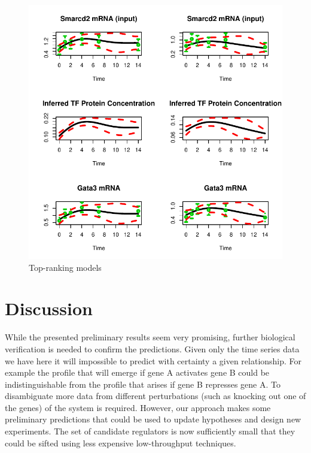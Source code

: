\documentclass{article}
\begin{document}
\begin{figure}[htb]
  \centering
  \includegraphics[width=\columnwidth]{gpdisim_Smarcd2_Gata3}
  \caption{Top-ranking models}
  \label{fig:model5}
\end{figure}

\section{Discussion}

While the  presented preliminary results seem  very promising, further
biological verification  is needed to confirm  the predictions.  Given
only the time  series data we have here it  will impossible to predict
with certainty a given relationship. For example the profile that will
emerge if gene A activates  gene B could be indistinguishable from the
profile that arises  if gene B represses gene  A. To disambiguate more
data from  different perturbations  (such as knocking  out one  of the
genes) of  the system  is required. However,  our approach  makes some
preliminary predictions  that could be  used to update  hypotheses and
design  new  experiments.  The  set  of  candidate  regulators is  now
sufficiently  small that  they could  be sifted  using  less expensive
low-throughput techniques.




\end{document}
